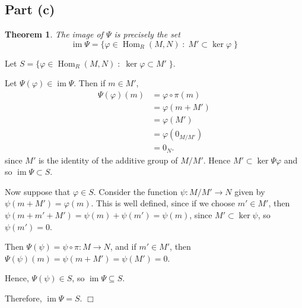 \documentclass[10pt]{article}
\newtheorem{theorem}{Theorem}
\newenvironment{proof}[1][Proof]{\begin{trivlist}
\item[\hskip \labelsep {\bfseries #1}]}{\end{trivlist}}
\newcommand{\im}{\operatorname{im}}
\newcommand{\Hom}{\operatorname{Hom}}
\begin{document}
\subsection*{Part (c)}
\begin{theorem}
    The image of $\Psi$ is precisely the set
    \begin{equation*}
        \im\Psi = \{ \varphi \in \Hom_R(M,N)\;:\;M'\subset\ker\varphi\;\}
    \end{equation*}    
\end{theorem}
\begin{proof}
    Let $S = \{ \varphi \in \Hom_R(M,N)\;:\;\ker\varphi\subset M'\;\}$.
    
    Let $\Psi(\varphi)\in \im\Psi$. Then if $m \in M'$,
    \begin{align*}
        \Psi(\varphi)(m) &= \varphi\circ\pi(m)\\
        &= \varphi(m+M')\\
        &= \varphi(M')\\
        &= \varphi(0_{M/M'})\\
        &= 0_N.
    \end{align*}
    since $M'$ is the identity of the additive group of $M/M'$. Hence $M'\subset\ker\Psi\varphi$ and
    so $\im\Psi \subset S$.
    
    Now suppose that $\varphi \in S$. Consider the function $\psi:M/M'\rightarrow N$
    given by $\psi(m+M') = \varphi(m)$. This is well defined, since if we choose
    $m' \in M'$, then $\psi(m+m'+M') = \psi(m)+\psi(m') = \psi(m)$,
    since $M'\subset \ker\psi$, so $\psi(m') = 0$.
    
    Then $\Psi(\psi) = \psi\circ\pi:M\rightarrow N$, and if $m'\in M'$, then
    $\Psi(\psi)(m) = \psi(m+M') = \psi(M') = 0$.
    
    Hence, $\Psi(\psi)\in S$, so $\im\Psi\subseteq S$.
    
    Therefore, $\im \Psi = S$. $\Box$
\end{proof}
\end{document}
